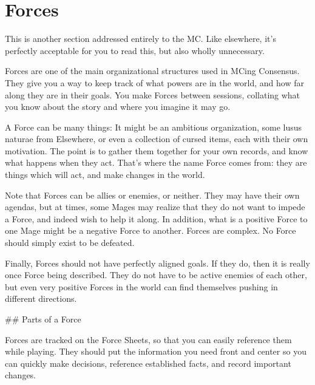 \documentclass[
  oneside,
  statementpaper,
  9pt]{memoir}
\begin{document}
\begin{Player}
\end{Player}

\newpage

\hypertarget{forces-2}{%
\chapter{Forces}\label{forces-2}}

\begin{Player}

This is another section addressed entirely to the MC. Like elsewhere, it's perfectly acceptable for you to read this, but also wholly unnecessary.

\end{Player}

\begin{MC}

Forces are one of the main organizational structures used in MCing Consensus. They give you a way to keep track of what powers are in the world, and how far along they are in their goals. You make Forces between sessions, collating what you know about the story and where you imagine it may go.

A Force can be many things: It might be an ambitious organization, some lusus naturae from Elsewhere, or even a collection of cursed items, each with their own motivation. The point is to gather them together for your own records, and know what happens when they act. That’s where the name Force comes from: they are things which will act, and make changes in the world.

Note that Forces can be allies or enemies, or neither. They may have their own agendas, but at times, some Mages may realize that they do not want to impede a Force, and indeed wish to help it along. In addition, what is a positive Force to one Mage might be a negative Force to another. Forces are complex. No Force should simply exist to be defeated.

Finally, Forces should not have perfectly aligned goals. If they do, then it is really once Force being described. They do not have to be active enemies of each other, but even very positive Forces in the world can find themselves pushing in different directions.

## Parts of a Force

Forces are tracked on the Force Sheets, so that you can easily reference them while playing. They should put the information you need front and center so you can quickly make decisions, reference established facts, and record important changes.


\end{MC}
\end{document}
